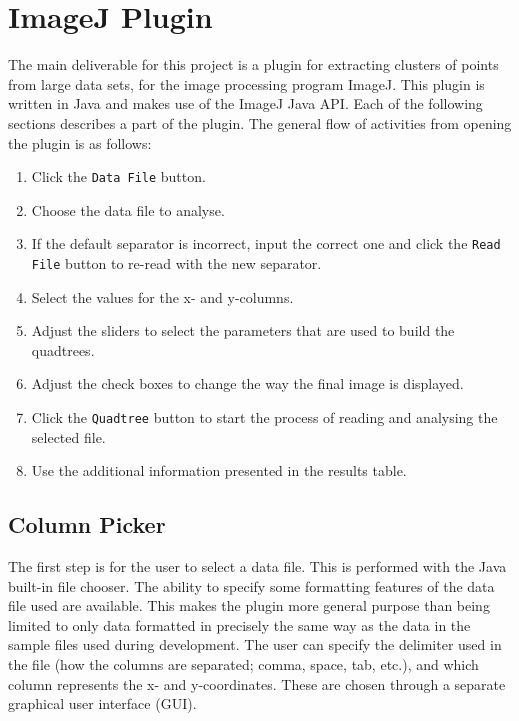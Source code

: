 
\section{ImageJ Plugin}
\label{sec:imagej_plugin}

The main deliverable for this project is a plugin for extracting clusters of
points from large data sets, for the image processing program ImageJ. This
plugin is written in Java and makes use of the ImageJ Java API\cite{imagejapi}.
Each of the following sections describes a part of the plugin. The general flow
of activities from opening the plugin is as follows:

\begin{enumerate}
	\item Click the \texttt{Data File} button.
	\item Choose the data file to analyse.
	\item If the default separator is incorrect, input the correct one and
		click the \texttt{Read File} button to re-read with the new separator.
	\item Select the values for the x- and y-columns.
	\item Adjust the sliders to select the parameters that are used to build
		the quadtrees.
	\item Adjust the check boxes to change the way the final image is
		displayed.
	\item Click the \texttt{Quadtree} button to start the process of reading
		and analysing the selected file.
	\item Use the additional information presented in the results table.
\end{enumerate}

\subsection{Column Picker}
\label{sub:column_picker}

The first step is for the user to select a data file. This is performed with
the Java built-in file chooser. The ability to specify some formatting features
of the data file used are available. This makes the plugin more general purpose
than being limited to only data formatted in precisely the same way as the data
in the sample files used during development. The user can specify the delimiter
used in the file (how the columns are separated; comma, space, tab, etc.), and
which column represents the x- and y-coordinates. These are chosen through a
separate graphical user interface (GUI).

